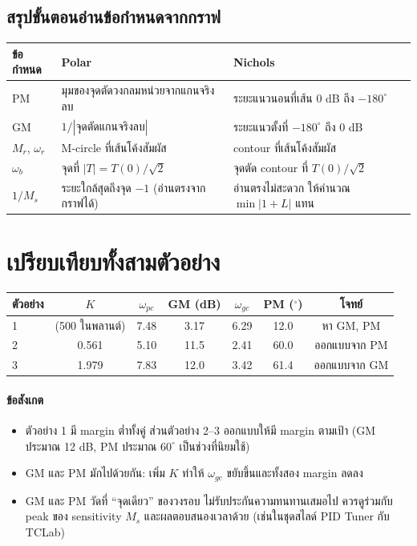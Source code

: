 \documentclass[12pt,a4paper]{article}
\begin{document}
\subsection{สรุปขั้นตอนอ่านข้อกำหนดจากกราฟ}
\begin{center}
\small
\renewcommand{\arraystretch}{1.25}
\begin{tabular}{@{}p{3.2cm}p{6.2cm}p{6.2cm}@{}}
\toprule
ข้อกำหนด & Polar & Nichols \\
\midrule
PM & มุมของจุดตัดวงกลมหน่วยจากแกนจริงลบ & ระยะแนวนอนที่เส้น $0$ dB ถึง $-180^\circ$ \\
GM & $1/|\text{จุดตัดแกนจริงลบ}|$ & ระยะแนวตั้งที่ $-180^\circ$ ถึง $0$ dB \\
$M_r$, $\omega_r$ & M-circle ที่เส้นโค้งสัมผัส & contour ที่เส้นโค้งสัมผัส \\
$\omega_b$ & จุดที่ $|T|=T(0)/\sqrt2$ & จุดตัด contour ที่ $T(0)/\sqrt2$ \\
$1/M_s$ & ระยะใกล้สุดถึงจุด $-1$ (อ่านตรงจากกราฟได้) & อ่านตรงไม่สะดวก ให้คำนวณ $\min|1+L|$ แทน \\
\bottomrule
\end{tabular}
\end{center}

\section{เปรียบเทียบทั้งสามตัวอย่าง}
\begin{center}
\small
\renewcommand{\arraystretch}{1.25}
\begin{tabular}{@{}lcccccc@{}}
\toprule
ตัวอย่าง & $K$ & $\omega_{pc}$ & GM (dB) & $\omega_{gc}$ & PM ($^\circ$) & โจทย์ \\
\midrule
1 & (500 ในพลานต์) & 7.48 & 3.17 & 6.29 & 12.0 & หา GM, PM \\
2 & 0.561 & 5.10 & 11.5 & 2.41 & 60.0 & ออกแบบจาก PM \\
3 & 1.979 & 7.83 & 12.0 & 3.42 & 61.4 & ออกแบบจาก GM \\
\bottomrule
\end{tabular}
\end{center}

\paragraph{ข้อสังเกต}
\begin{itemize}[leftmargin=1.2em,itemsep=2pt]
\item ตัวอย่าง 1 มี margin ต่ำทั้งคู่ ส่วนตัวอย่าง 2--3 ออกแบบให้มี margin ตามเป้า (GM ประมาณ 12 dB, PM ประมาณ $60^\circ$ เป็นช่วงที่นิยมใช้)
\item GM และ PM มักไปด้วยกัน: เพิ่ม $K$ ทำให้ $\omega_{gc}$ ขยับขึ้นและทั้งสอง margin ลดลง
\item GM และ PM วัดที่ ``จุดเดียว'' ของวงรอบ ไม่รับประกันความทนทานเสมอไป ควรดูร่วมกับ peak ของ sensitivity $M_s$ และผลตอบสนองเวลาด้วย (เช่นในชุดสไลด์ PID Tuner กับ TCLab)
\end{itemize}
\end{document}
